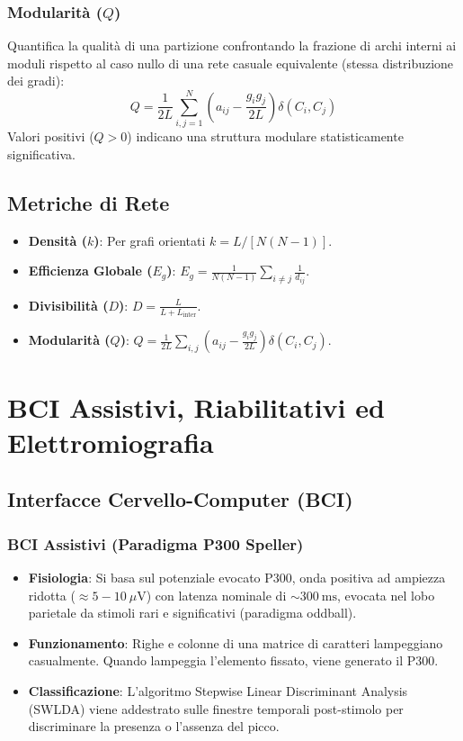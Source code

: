 \documentclass[10pt, letterpaper]{report}
\begin{document}
\subsection{Modularità ($Q$)}
Quantifica la qualità di una partizione confrontando la frazione di archi interni ai moduli rispetto al caso nullo di una rete casuale equivalente (stessa distribuzione dei gradi):
\[
Q = \frac{1}{2L} \sum_{i,j=1}^N \left( a_{ij} - \frac{g_i g_j}{2L} \right) \delta(C_i, C_j)
\]
Valori positivi ($Q > 0$) indicano una struttura modulare statisticamente significativa.

\section{Metriche di Rete}
\begin{itemize}
    \item \textbf{Densità ($k$)}: Per grafi orientati $k = L / [N(N-1)]$.
    \item \textbf{Efficienza Globale ($E_g$)}: $E_g = \frac{1}{N(N-1)} \sum_{i \neq j} \frac{1}{d_{ij}}$.
    \item \textbf{Divisibilità ($D$)}: $D = \frac{L}{L + L_{\text{inter}}}$.
    \item \textbf{Modularità ($Q$)}: $Q = \frac{1}{2L} \sum_{i,j} (a_{ij} - \frac{g_i g_j}{2L}) \delta(C_i, C_j)$.
\end{itemize}

\chapter{BCI Assistivi, Riabilitativi ed Elettromiografia}

\section{Interfacce Cervello-Computer (BCI)}

\subsection{BCI Assistivi (Paradigma P300 Speller)}
\begin{itemize}
    \item \textbf{Fisiologia}: Si basa sul potenziale evocato P300, onda positiva ad ampiezza ridotta ($\approx 5-10\ \mu\text{V}$) con latenza nominale di $\sim 300\ \text{ms}$, evocata nel lobo parietale da stimoli rari e significativi (paradigma oddball).
    \item \textbf{Funzionamento}: Righe e colonne di una matrice di caratteri lampeggiano casualmente. Quando lampeggia l'elemento fissato, viene generato il P300.
    \item \textbf{Classificazione}: L'algoritmo Stepwise Linear Discriminant Analysis (SWLDA) viene addestrato sulle finestre temporali post-stimolo per discriminare la presenza o l'assenza del picco.
\end{itemize}
\end{document}
